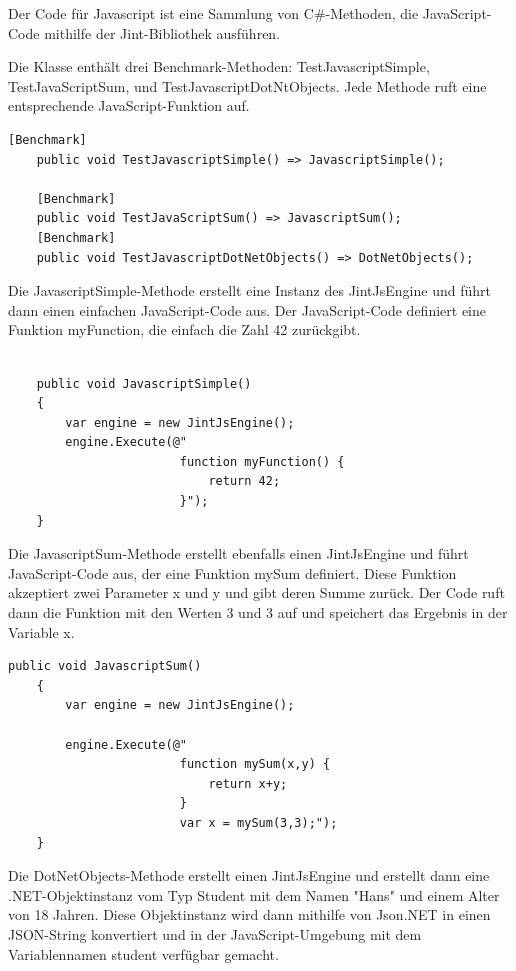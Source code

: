         Der Code für Javascript ist eine Sammlung von C\#-Methoden, die JavaScript-Code mithilfe der Jint-Bibliothek ausführen. 

Die Klasse enthält drei Benchmark-Methoden: TestJavascriptSimple, TestJavaScriptSum, und TestJavascriptDotNtObjects. Jede Methode ruft eine entsprechende JavaScript-Funktion auf.

\begin{lstlisting}[language={[Sharp]C}, caption=JavaScriptBenchmark, label=lst:imp:jsBench]
    [Benchmark]
    public void TestJavascriptSimple() => JavascriptSimple();

    [Benchmark]
    public void TestJavaScriptSum() => JavascriptSum();
    [Benchmark]
    public void TestJavascriptDotNetObjects() => DotNetObjects();
\end{lstlisting}

Die JavascriptSimple-Methode erstellt eine Instanz des JintJsEngine und führt dann einen einfachen JavaScript-Code aus. Der JavaScript-Code definiert eine Funktion myFunction, die einfach die Zahl 42 zurückgibt.
\begin{lstlisting}[language={[Sharp]C}, caption=JavascriptSimple, label=lst:imp:jsSimple]
    
    public void JavascriptSimple()
    {
        var engine = new JintJsEngine();           
        engine.Execute(@"
                        function myFunction() {
                            return 42;
                        }");           
    }
\end{lstlisting}

Die JavascriptSum-Methode erstellt ebenfalls einen JintJsEngine und führt JavaScript-Code aus, der eine Funktion mySum definiert. Diese Funktion akzeptiert zwei Parameter x und y und gibt deren Summe zurück. Der Code ruft dann die Funktion mit den Werten 3 und 3 auf und speichert das Ergebnis in der Variable x.

\begin{lstlisting}[language={[Sharp]C}, caption=JavascriptSum, label=lst:imp:jsSum]
    public void JavascriptSum()
    {
        var engine = new JintJsEngine();

        engine.Execute(@"
                        function mySum(x,y) {
                            return x+y;
                        }
                        var x = mySum(3,3);");
    }
\end{lstlisting}
Die DotNetObjects-Methode erstellt einen JintJsEngine und erstellt dann eine .NET-Objektinstanz vom Typ Student mit dem Namen "Hans" und einem Alter von 18 Jahren. Diese Objektinstanz wird dann mithilfe von Json.NET in einen JSON-String konvertiert und in der JavaScript-Umgebung mit dem Variablennamen student verfügbar gemacht.

